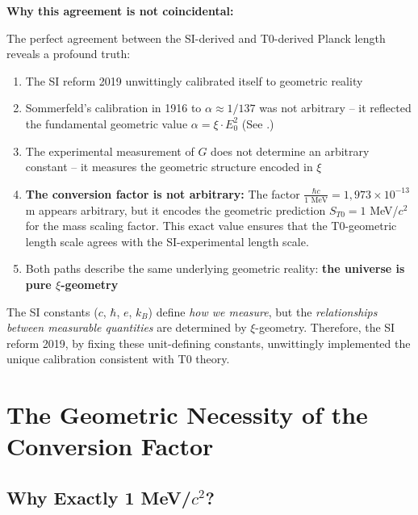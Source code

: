 	\begin{warning}
		\textbf{Why this agreement is not coincidental:}
		
		The perfect agreement between the SI-derived and T0-derived Planck length reveals a profound truth:
		
		\begin{enumerate}
			\item The SI reform 2019 unwittingly calibrated itself to geometric reality
			
			\item Sommerfeld's calibration in 1916 to $\alpha \approx 1/137$ was not arbitrary -- it reflected the fundamental geometric value $\alpha = \xi \cdot E_0^2$ (See \cite{T0_fine_structure_En}.)
			
			\item The experimental measurement of $G$ does not determine an arbitrary constant -- it measures the geometric structure encoded in $\xi$
			
			\item \textbf{The conversion factor is not arbitrary:} The factor $\frac{\hbar c}{1 \text{ MeV}} = 1{,}973 \times 10^{-13}$ m appears arbitrary, but it encodes the geometric prediction $S_{T0} = 1$ MeV/$c^2$ for the mass scaling factor. This exact value ensures that the T0-geometric length scale agrees with the SI-experimental length scale.
			
			\item Both paths describe the same underlying geometric reality: \textbf{the universe is pure $\xi$-geometry}
		\end{enumerate}
		
		The SI constants ($c$, $\hbar$, $e$, $k_B$) define \emph{how we measure}, but the \emph{relationships between measurable quantities} are determined by $\xi$-geometry. Therefore, the SI reform 2019, by fixing these unit-defining constants, unwittingly implemented the unique calibration consistent with T0 theory.
	\end{warning}
	
	\section{The Geometric Necessity of the Conversion Factor}
	
	\subsection{Why Exactly 1 MeV/$c^2$?}
	
